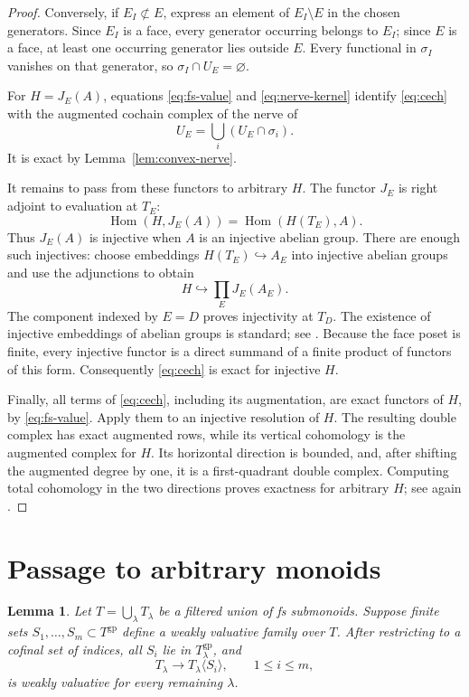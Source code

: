 \documentclass[11pt]{article}
\newtheorem{lemma}[theorem]{Lemma}
\theoremstyle{definition}
\theoremstyle{remark}
\DeclareMathOperator{\Hom}{Hom}
\newcommand{\gp}{\mathrm{gp}}
\begin{document}
\begin{proof}
Conversely, if \(E_I\not\subset E\), express an element of
\(E_I\setminus E\) in the chosen generators. Since \(E_I\) is a
face, every generator occurring belongs to \(E_I\); since \(E\)
is a face, at least one occurring generator lies outside \(E\).
Every functional in \(\sigma_I\) vanishes on that generator, so
\(\sigma_I\cap U_E=\varnothing\).

For \(H=J_E(A)\), equations \eqref{eq:fs-value} and
\eqref{eq:nerve-kernel} identify \eqref{eq:cech} with the augmented
cochain complex of the nerve of
\[
U_E=\bigcup_i(U_E\cap\sigma_i).
\]
It is exact by Lemma~\ref{lem:convex-nerve}.

It remains to pass from these functors to arbitrary \(H\).
The functor \(J_E\) is right adjoint to evaluation at \(T_E\):
\[
\Hom(H,J_E(A))=\Hom(H(T_E),A).
\]
Thus \(J_E(A)\) is injective when \(A\) is an injective abelian
group. There are enough such injectives: choose embeddings
\(H(T_E)\hookrightarrow A_E\) into injective abelian groups and
use the adjunctions to obtain
\[
H\hookrightarrow\prod_E J_E(A_E).
\]
The component indexed by \(E=D\) proves injectivity at \(T_D\).
The existence of injective embeddings of abelian groups is
standard; see \cite[Tag~01D6]{Stacks}.
Because the face poset is finite, every injective functor is a
direct summand of a finite product of functors of this form.
Consequently \eqref{eq:cech} is exact for injective \(H\).

Finally, all terms of \eqref{eq:cech}, including its augmentation,
are exact functors of \(H\), by \eqref{eq:fs-value}. Apply them to
an injective resolution of \(H\). The resulting double complex
has exact augmented rows, while its vertical cohomology is the
augmented complex for \(H\). Its horizontal direction is bounded,
and, after shifting the augmented degree by one, it is a
first-quadrant double complex. Computing total cohomology in the
two directions proves exactness for arbitrary \(H\); see again
\cite[Tag~012X]{Stacks}.
\end{proof}


\section{Passage to arbitrary monoids}

\begin{lemma}\label{lem:weak-descent}
Let \(T=\bigcup_\lambda T_\lambda\) be a filtered union of fs
submonoids. Suppose finite sets \(S_1,\ldots,S_m\subset T^{\gp}\)
define a weakly valuative family over \(T\). After restricting to
a cofinal set of indices, all \(S_i\) lie in \(T_\lambda^{\gp}\),
and
\[
T_\lambda\longrightarrow T_\lambda\langle S_i\rangle,
\qquad 1\le i\le m,
\]
is weakly valuative for every remaining \(\lambda\).
\end{lemma}
\end{document}
